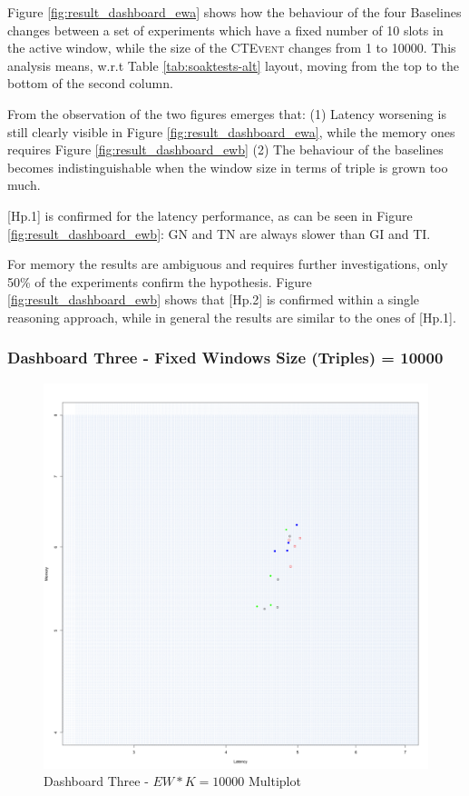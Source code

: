 Figure \ref{fig:result_dashboard_ewa} shows how the behaviour of the four Baselines changes between a set of experiments which have a fixed number of 10 slots in the active window, while the size of the \textsc{CTEvent} changes from 1 to 10000. This analysis means, w.r.t Table \ref{tab:soaktests-alt} layout, moving from the top to the bottom of the second column.

From the observation of the two figures emerges that: (1) Latency worsening is still clearly visible in Figure \ref{fig:result_dashboard_ewa}, while the memory ones requires Figure \ref{fig:result_dashboard_ewb} (2) The behaviour of the baselines becomes indistinguishable when the window size in terms of triple is grown too much. 

[Hp.1] is confirmed for the latency performance, as can be seen in Figure \ref{fig:result_dashboard_ewb}: GN and TN are always slower than GI and TI. 

For memory the results are ambiguous and requires further investigations, only 50\% of the experiments confirm the hypothesis. Figure \ref{fig:result_dashboard_ewb} shows that [Hp.2] is confirmed within a single reasoning approach, while in general the results are similar to the ones of [Hp.1].

\subsubsection{Dashboard Three - Fixed Windows Size (Triples) = 10000 } 

\begin{figure}[h!tbp]
	\centering
	\includegraphics[width=0.90\linewidth]{images/dashboard-3}	
	\caption[\textsc{Analyser} Investigation Stack - Level 0 - Dashboard Three - Multiplot Version]{Dashboard Three - $EW*K=10000$ Multiplot} 
	\label{fig:result_dashboard_probb}
\end{figure}

